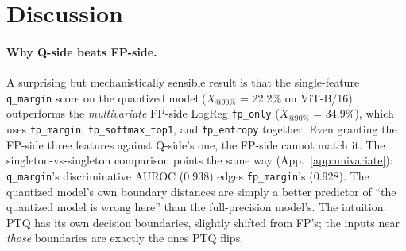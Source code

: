 \documentclass{article}
\makeatletter
\newcommand{\fp}{\textsc{FP}\xspace}
\newcommand{\ptq}{\textsc{PTQ}\xspace}
\newcommand{\good}{\textsc{good}\xspace}
\newcommand{\xat}[1]{\ensuremath{X_{@#1\%}}}
\makeatother
\begin{document}
\section{Discussion}\label{sec:discussion}

\paragraph{Why Q-side beats FP-side.}
A surprising but mechanistically sensible result is that the single-feature \texttt{q\_margin} score on the quantized model (\xat{90} = 22.2\% on ViT-B/16) outperforms the \emph{multivariate} FP-side LogReg \texttt{fp\_only} (\xat{90} = 34.9\%), which uses \texttt{fp\_margin}, \texttt{fp\_softmax\_top1}, and \texttt{fp\_entropy} together. Even granting the FP-side three features against Q-side's one, the FP-side cannot match it. The singleton-vs-singleton comparison points the same way (App.~\ref{app:univariate}): \texttt{q\_margin}'s discriminative AUROC (0.938) edges \texttt{fp\_margin}'s (0.928). The quantized model's own boundary distances are simply a better predictor of ``the quantized model is wrong here'' than the full-precision model's. The intuition: \ptq{} has its own decision boundaries, slightly shifted from \fp's; the inputs near \emph{those} boundaries are exactly the ones \ptq{} flips.

\end{document}
